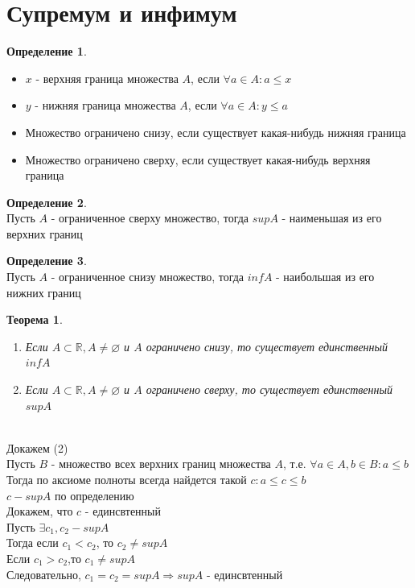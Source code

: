 \documentclass[12pt,letterpaper]{report}
\makeatletter
\newtheorem*{theorem-non}{Теорема}
\theoremstyle{definition}
\newtheorem*{conj}{Определение}
\newcommand{\R}{\mathbb{R}}
\renewenvironment{proof}[1][\proofname]{%
   \par\pushQED{\qed}\normalfont%
   \topsep6\p@\@plus6\p@\relax
   \trivlist\item[\hskip\labelsep\bfseries#1\@addpunct{.}]%
   \ignorespaces
}{%
   \popQED\endtrivlist\@endpefalse
}
\makeatother
\begin{document}
\section{Супремум и инфимум}
\begin{conj}
    \quad \\
    \begin{itemize}
        \item[] $x$ - верхняя граница множества $A$, если $\forall a \in A: a \leqslant x$
        \item[] $y$ - нижняя граница множества $A$, если $\forall a \in A: y \leqslant a$ 
        \item[] Множество ограничено снизу, если существует какая-нибудь нижняя граница
        \item[] Множество ограничено сверху, если существует какая-нибудь верхняя граница
    \end{itemize}
\end{conj}
\begin{conj}
    \quad \\
    Пусть $A$ - ограниченное сверху множество, тогда $sup A$ - наименьшая из его верхних границ
\end{conj}
\begin{conj}
    \quad \\
    Пусть $A$ - ограниченное снизу множество, тогда $inf A$ - наибольшая из его нижних границ
\end{conj}
\begin{theorem-non}
    \quad \\
    \begin{enumerate}
        \item Если $A \subset \R, A \neq \varnothing $ и $ A $ ограничено снизу, то существует единственный $inf A$
        \item Если $A \subset \R, A \neq \varnothing $ и $ A $ ограничено сверху, то существует единственный $sup A$
    \end{enumerate}
\end{theorem-non}
\begin{proof}
    \quad \\
    Докажем (2) \\
    Пусть $B$ - множество всех верхних границ множества $A$, т.е. $\forall a \in A, b \in B: a \leqslant b$ \\
    Тогда по аксиоме полноты всегда найдется такой $c: a \leqslant c \leqslant b$ \\
    $c - sup A$ по определению \\
    Докажем, что $c$ - единсвтенный \\
    Пусть $\exists c_1, c_2 - sup A$ \\
    Тогда если $c_1 < c_2$, то $c_2 \neq sup A$ \\
    Если $c_1 > c_2$,то $c_1 \neq sup A$ \\
    Следовательно, $c_1 = c_2 = sup A \Longrightarrow sup A$ - единсвтенный  
\end{proof}
\end{document}

